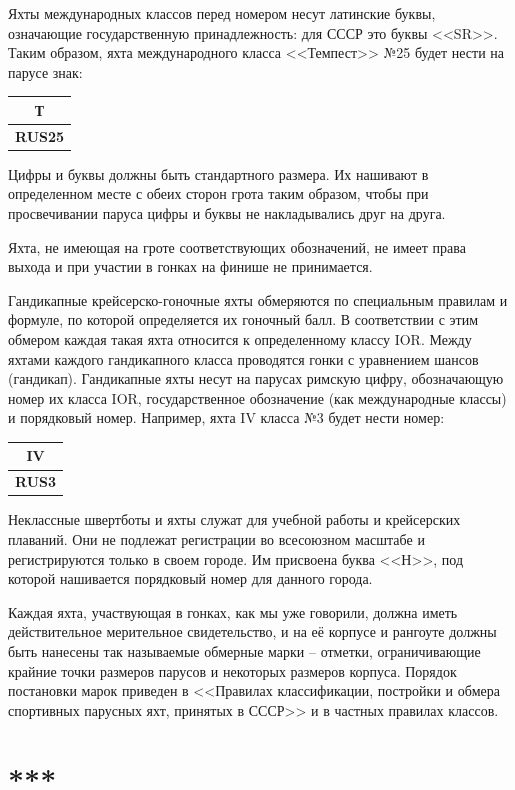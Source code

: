 \documentclass[a4paper, 12pt, twoside, final]{scrbook}
\begin{document}
Яхты международных классов перед номером несут латинские буквы, означающие
государственную принадлежность: для СССР это буквы <<SR>>. Таким образом,
яхта международного класса <<Темпест>> №25 будет нести на парусе знак:
\begin{tabular}{c}
\textbf{Т}\tabularnewline
\hline 
\textbf{RUS25}\tabularnewline
\end{tabular}

Цифры и буквы должны быть стандартного размера. Их нашивают в определенном
месте с обеих сторон грота таким образом, чтобы при просвечивании
паруса цифры и буквы не накладывались друг на друга.

Яхта, не имеющая на гроте соответствующих обозначений, не имеет права
выхода и при участии в гонках на финише не принимается.

Гандикапные крейсерско-гоночные яхты обмеряются по специальным правилам
и формуле, по которой определяется их гоночный балл. В соответствии
с этим обмером каждая такая яхта относится к определенному классу
IOR. Между яхтами каждого гандикапного класса проводятся гонки с уравнением
шансов (гандикап). Гандикапные яхты несут на парусах римскую цифру,
обозначающую номер их класса IOR, государственное обозначение (как
международные классы) и порядковый номер. Например, яхта IV класса
№3 будет нести номер:%
\begin{tabular}{c}
\textbf{IV}\tabularnewline
\hline 
\textbf{RUS3}\tabularnewline
\end{tabular}

Неклассные швертботы и яхты служат для учебной работы и крейсерских
плаваний. Они не подлежат регистрации во всесоюзном масштабе и регистрируются
только в своем городе. Им присвоена буква <<Н>>, под которой нашивается
порядковый номер для данного города.

Каждая яхта, участвующая в гонках, как мы уже говорили, должна иметь
действительное мерительное свидетельство, и на её корпусе и рангоуте
должны быть нанесены так называемые обмерные марки \--- отметки, ограничивающие
крайние точки размеров парусов и некоторых размеров корпуса. Порядок
постановки марок приведен в <<Правилах классификации, постройки и обмера
спортивных парусных яхт, принятых в СССР>> и в частных правилах классов.

%
%

\section*{{*}{*}{*}}
\end{document}

